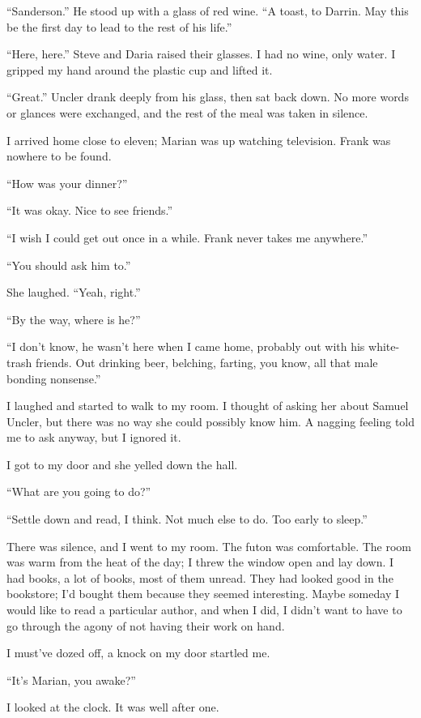``Sanderson.'' He stood up with a glass of red wine. ``A toast, to
Darrin. May this be the first day to lead to the rest of his life.''

``Here, here.'' Steve and Daria raised their glasses. I had no wine,
only water. I gripped my hand around the plastic cup and lifted it.

``Great.'' Uncler drank deeply from his glass, then sat back down. No
more words or glances were exchanged, and the rest of the meal was taken
in silence.

I arrived home close to eleven; Marian was up watching television. Frank
was nowhere to be found.

``How was your dinner?''

``It was okay. Nice to see friends.''

``I wish I could get out once in a while. Frank never takes me
anywhere.''

``You should ask him to.''

She laughed. ``Yeah, right.''

``By the way, where is he?''

``I don't know, he wasn't here when I came home, probably out with his
white-trash friends. Out drinking beer, belching, farting, you know, all
that male bonding nonsense.''

I laughed and started to walk to my room. I thought of asking her about
Samuel Uncler, but there was no way she could possibly know him. A
nagging feeling told me to ask anyway, but I ignored it.

I got to my door and she yelled down the hall.

``What are you going to do?''

``Settle down and read, I think. Not much else to do. Too early to
sleep.''

There was silence, and I went to my room. The futon was comfortable. The
room was warm from the heat of the day; I threw the window open and lay
down. I had books, a lot of books, most of them unread. They had looked
good in the bookstore; I'd bought them because they seemed interesting.
Maybe someday I would like to read a particular author, and when I did,
I didn't want to have to go through the agony of not having their work
on hand.

I must've dozed off, a knock on my door startled me.

``It's Marian, you awake?''

I looked at the clock. It was well after one.

